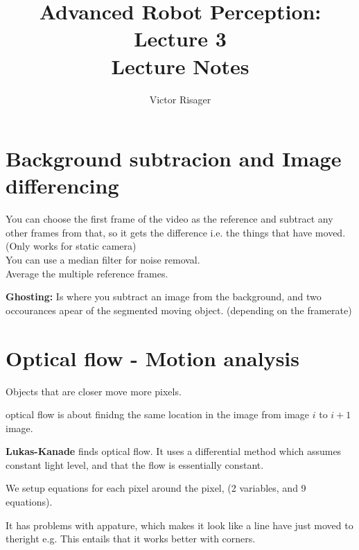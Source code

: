 \documentclass[a4paper]{article}
\title{Advanced Robot Perception: Lecture 3 \\
	\large Lecture Notes}
\author{Victor Risager}
\begin{document}
\maketitle

\section{Background subtracion and Image differencing}
You can choose the first frame of the video as the reference and subtract any other frames from that, so it gets the difference i.e. the things that have moved. (Only works for static camera) \\
You can use a median filter for noise removal. \\
Average the multiple reference frames. 

\vspace{5pt}

\textbf{Ghosting:} Is where you subtract an image from the background, and two occourances apear of the segmented moving object. (depending on the framerate)



\section{Optical flow - Motion analysis}
Objects that are closer move more pixels. 

optical flow is about finidng the same location in the image from image $ i $ to $ i+1 $ image. 

\textbf{Lukas-Kanade} finds optical flow. It uses a differential method which assumes constant light level, and that the flow is essentially constant.

We setup equations for each pixel around the pixel, (2 variables, and 9 equations).

It has problems with appature, which makes it look like a line have just moved to theright e.g. This entails that it works better with corners. 
\end{document}
